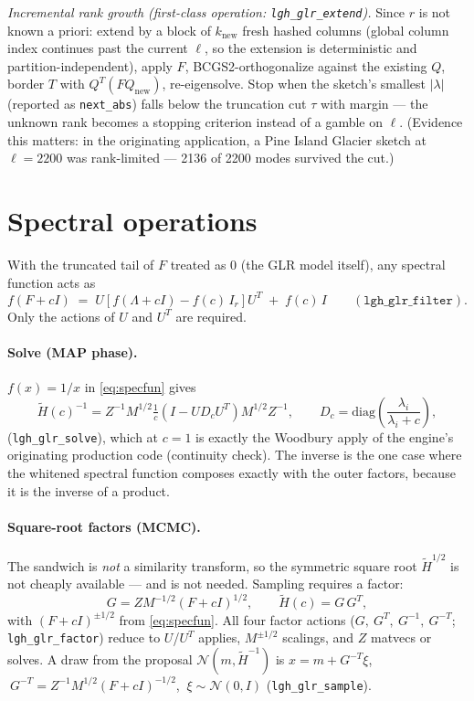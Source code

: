 \documentclass[11pt]{article}
\newcommand{\Ht}{\widetilde{H}}
\begin{document}
\emph{Incremental rank growth (first-class operation: \texttt{lgh\_glr\_extend}).}
Since $r$ is not known a priori: extend by a block of $k_{\mathrm{new}}$ fresh
hashed columns (global column index continues past the current $\ell$, so the
extension is deterministic and partition-independent), apply $F$,
BCGS2-orthogonalize against the existing $Q$, border $T$ with
$Q^T (F Q_{\mathrm{new}})$, re-eigensolve.  Stop when the sketch's smallest
$|\lambda|$ (reported as \texttt{next\_abs}) falls below the truncation cut $\tau$
with margin --- the unknown rank becomes a stopping criterion instead of a gamble on
$\ell$.  (Evidence this matters: in the originating application, a Pine Island
Glacier sketch at $\ell = 2200$ was rank-limited --- 2136 of 2200 modes survived
the cut.)

\section{Spectral operations}

With the truncated tail of $F$ treated as $0$ (the GLR model itself), any spectral
function acts as
\begin{equation}
f(F + cI) \;=\; U\!\left[ f(\Lambda + cI) - f(c)\,I_r \right]\! U^T \;+\; f(c)\, I
\qquad (\texttt{lgh\_glr\_filter}).
\label{eq:specfun}
\end{equation}
Only the actions of $U$ and $U^T$ are required.

\paragraph{Solve (MAP phase).}  $f(x) = 1/x$ in \eqref{eq:specfun} gives
\begin{equation}
\Ht(c)^{-1} = Z^{-1} M^{1/2}
  \tfrac{1}{c}\!\left( I - U D_c U^T \right) M^{1/2} Z^{-1},
\qquad D_c = \mathrm{diag}\!\left( \frac{\lambda_i}{\lambda_i + c} \right),
\end{equation}
(\texttt{lgh\_glr\_solve}), which at $c = 1$ is exactly the Woodbury apply of the
engine's originating production code (continuity check).  The inverse is the one
case where the whitened spectral function composes exactly with the outer factors,
because it is the inverse of a product.

\paragraph{Square-root factors (MCMC).}  The sandwich is \emph{not} a similarity
transform, so the symmetric square root $\Ht^{1/2}$ is not cheaply available --- and
is not needed.  Sampling requires a factor:
\begin{equation}
G = Z M^{-1/2} (F + cI)^{1/2}, \qquad \Ht(c) = G\,G^T,
\end{equation}
with $(F+cI)^{\pm 1/2}$ from \eqref{eq:specfun}.  All four factor actions
($G,\ G^T,\ G^{-1},\ G^{-T}$; \texttt{lgh\_glr\_factor}) reduce to $U$/$U^T$
applies, $M^{\pm 1/2}$ scalings, and $Z$ matvecs or solves.  A draw from the
proposal $\mathcal{N}(m, \Ht^{-1})$ is $x = m + G^{-T}\xi$,
$\ G^{-T} = Z^{-1} M^{1/2} (F + cI)^{-1/2}$, $\ \xi \sim \mathcal{N}(0, I)$
(\texttt{lgh\_glr\_sample}).
\end{document}
